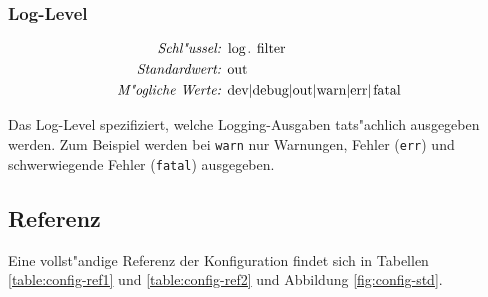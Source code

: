\subsubsection{Log-Level}

\begin{align*}
    \emph{Schl"ussel: } & \lstinline{log.filter}\\
    \emph{Standardwert: } & \lstinline{out}\\
    \emph{M"ogliche Werte: } & \lstinline{dev|debug|out|warn|err|fatal}
\end{align*}

Das Log-Level spezifiziert, welche Logging-Ausgaben tats"achlich
ausgegeben werden. Zum Beispiel werden bei \lstinline{warn}
nur Warnungen, Fehler (\lstinline{err}) und schwerwiegende Fehler
(\lstinline{fatal}) ausgegeben.

\subsection{Referenz}

Eine vollst"andige Referenz der Konfiguration
findet sich in Tabellen
\ref{table:config-ref1} und \ref{table:config-ref2}
und Abbildung
\ref{fig:config-std}.


